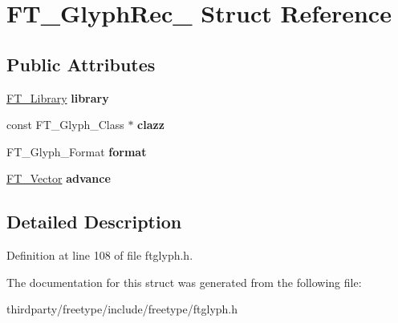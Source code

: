 \hypertarget{struct_f_t___glyph_rec__}{}\section{F\+T\+\_\+\+Glyph\+Rec\+\_\+ Struct Reference}
\label{struct_f_t___glyph_rec__}
\subsection*{Public Attributes}
\begin{DoxyCompactItemize}
\item 
\mbox{\label{struct_f_t___glyph_rec___a00679b5e2519affab0f3999718817f8e}} 
\hyperlink{struct_f_t___library_rec__}{F\+T\+\_\+\+Library} {\bfseries library}
\item 
\mbox{\label{struct_f_t___glyph_rec___ad7074cfe0e9fd6616e4dc4011e481524}} 
const F\+T\+\_\+\+Glyph\+\_\+\+Class $\ast$ {\bfseries clazz}
\item 
\mbox{\label{struct_f_t___glyph_rec___a26b42a2610a69dcaed3e7c8b6d506211}} 
F\+T\+\_\+\+Glyph\+\_\+\+Format {\bfseries format}
\item 
\mbox{\label{struct_f_t___glyph_rec___afd95b047df6a249db79018a279137018}} 
\hyperlink{struct_f_t___vector__}{F\+T\+\_\+\+Vector} {\bfseries advance}
\end{DoxyCompactItemize}


\subsection{Detailed Description}


Definition at line 108 of file ftglyph.\+h.



The documentation for this struct was generated from the following file\+:\begin{DoxyCompactItemize}
\item 
thirdparty/freetype/include/freetype/ftglyph.\+h\end{DoxyCompactItemize}
